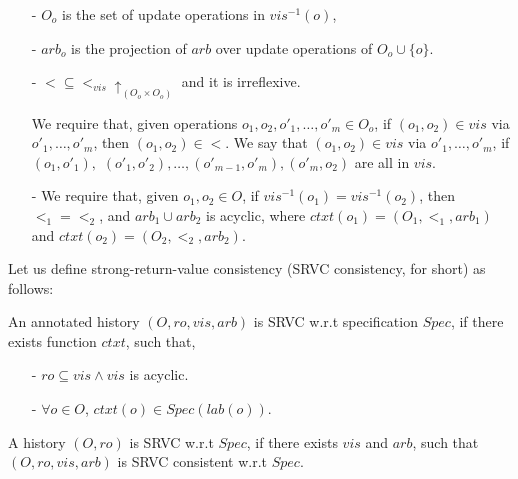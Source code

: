 \begin{itemize}
\setlength{\itemsep}{0.5pt}
\item[-] $O_o$ is the set of update operations in $\mathit{vis}^{-1}(o)$,

\item[-] $arb_o$ is the projection of $arb$ over update operations of $O_o \cup \{ o \}$.

\item[-] $< \subseteq <_{\mathit{vis}} \uparrow_{(O_o \times O_o)}$ and it is irreflexive.

We require that, given operations $o_1,o_2,o'_1,\ldots,o'_m \in O_o$, if $(o_1,o_2) \in \mathit{vis}$ via $o'_1,\ldots,o'_m$, then $(o_1,o_2) \in <$. We say that $(o_1,o_2) \in \mathit{vis}$ via $o'_1,\ldots,o'_m$, if $(o_1,o'_1),$ $(o'_1,o'_2), \ldots, (o'_{\mathit{m-1}},o'_m),(o'_m,o_2)$ are all in $\mathit{vis}$.

\item[-] {\color {red}We require that, given $o_1,o_2 \in O$, if $\mathit{vis}^{-1}(o_1) = \mathit{vis}^{-1}(o_2)$, then $<_1 = <_2$, and $arb_1 \cup arb_2$ is acyclic, where $ctxt(o_1)=(O_1,<_1,arb_1)$ and $ctxt(o_2)=(O_2,<_2,arb_2)$.}
\end{itemize}

Let us define strong-return-value consistency (SRVC consistency, for short) as follows:


\begin{definition}
\label{definition:strong return value consistency}
An annotated history $(O,\mathit{ro},\mathit{vis},\mathit{arb})$ is SRVC w.r.t specification $Spec$, if there exists function $ctxt$, such that,

\begin{itemize}
\setlength{\itemsep}{0.5pt}
\item[-] $\mathit{ro} \subseteq \mathit{vis} \wedge \mathit{vis}$ is acyclic.

\item[-] $\forall o \in O$, $ctxt(o) \in Spec(lab(o))$.
\end{itemize}

A history $(O,\mathit{ro})$ is SRVC w.r.t $Spec$, if there exists $\mathit{vis}$ and $\mathit{arb}$, such that $(O,\mathit{ro},\mathit{vis},\mathit{arb})$ is SRVC consistent w.r.t $Spec$.
\end{definition}


